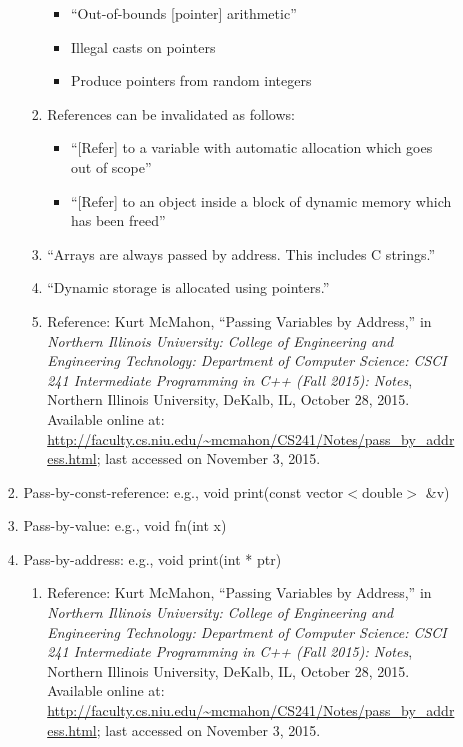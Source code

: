 \begin{enumerate}
\begin{enumerate}
\begin{enumerate}
\begin{enumerate}
\begin{itemize}
				\item ``Out-of-bounds [pointer] arithmetic''
				\item Illegal casts on pointers
				\item Produce pointers from random integers
				\end{itemize}
			\item References can be invalidated as follows: \vspace{-0.1cm}
				\begin{itemize} \itemsep -1pt
				\item ``[Refer] to a variable with automatic allocation which goes out of scope''
				\item ``[Refer] to an object inside a block of dynamic memory which has been freed''
				\end{itemize}
			\item ``Arrays are always passed by address. This includes C strings.''
			\item ``Dynamic storage is allocated using pointers.''
			\item Reference: Kurt McMahon, ``Passing Variables by Address,'' in {\it Northern Illinois University: College of Engineering and Engineering Technology: Department of Computer Science: CSCI 241 Intermediate Programming in C++ (Fall 2015): Notes}, Northern Illinois University, DeKalb, IL, October 28, 2015. Available online at: \url{http://faculty.cs.niu.edu/~mcmahon/CS241/Notes/pass_by_address.html}; last accessed on November 3, 2015.
			\end{enumerate}
		\item Pass-by-const-reference: e.g., void print(const vector$<$double$>$ \&v)
		\item Pass-by-value: e.g., void fn(int x)
		\item Pass-by-address: e.g., void print(int * ptr) \vspace{-0.1cm}
			\begin{enumerate} \itemsep -1pt
			\item Reference: Kurt McMahon, ``Passing Variables by Address,'' in {\it Northern Illinois University: College of Engineering and Engineering Technology: Department of Computer Science: CSCI 241 Intermediate Programming in C++ (Fall 2015): Notes}, Northern Illinois University, DeKalb, IL, October 28, 2015. Available online at: \url{http://faculty.cs.niu.edu/~mcmahon/CS241/Notes/pass_by_address.html}; last accessed on November 3, 2015.
			\end{enumerate}
		\end{enumerate}

\end{enumerate}
\end{enumerate}
